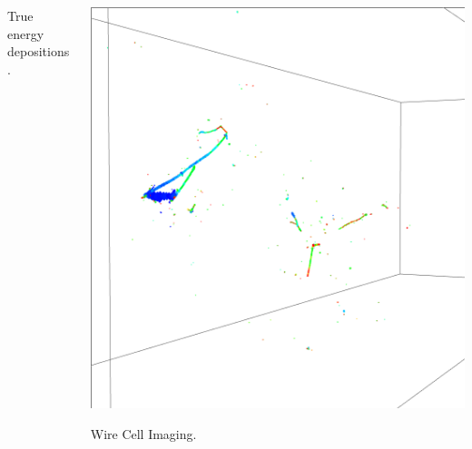 \documentclass[xcolor=dvipsnames]{beamer}
\begin{document}
\begin{frame}[fragile]
\begin{columns}
\begin{column}{0.5\textwidth}
\begin{center}
        True energy depositions.
      \end{center}
    \end{column}
    \begin{column}{0.5\textwidth}
      \begin{center}
        \includegraphics[width=\textwidth,trim=3cm 10cm 3cm 10cm,clip]{payoff-reco.png}

        Wire Cell Imaging.
      \end{center}
    \end{column}
  \end{columns}

  \vfill


\end{frame}
\end{document}
